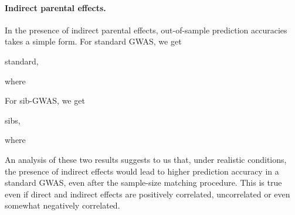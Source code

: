 \documentclass[hidelinks, 12pt]{article}
\begin{document}
\paragraph{Indirect parental effects.}  In the presence of indirect parental effects, out-of-sample prediction accuracies takes a simple form. For standard GWAS, we get

standard,

where

For sib-GWAS, we get

sibs,

where

An analysis of these two results suggests to us that, under realistic conditions, the presence of indirect effects would lead to higher prediction accuracy in a standard GWAS,  even after the sample-size matching procedure.  This is true even if direct and indirect effects are positively correlated, uncorrelated or even somewhat negatively correlated.
\end{document}
